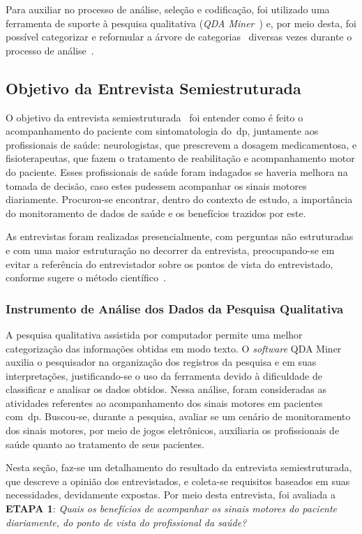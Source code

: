 Para auxiliar no processo de análise, seleção e codificação, foi utilizado uma ferramenta de suporte à pesquisa qualitativa (\textit{QDA Miner}~\cite{qda13}) e, por meio desta, foi possível categorizar e reformular a árvore de categorias~\cite{FLI04} diversas vezes durante o processo de análise~\cite{FLI04}.


\subsection{Objetivo da Entrevista Semiestruturada}
O objetivo da entrevista semiestruturada~\cite{FLI04} foi entender como é feito o acompanhamento do paciente com sintomatologia do~\ac{dp}, juntamente aos profissionais de saúde: neurologistas, que prescrevem a dosagem medicamentosa, e fisioterapeutas, que fazem o tratamento de reabilitação e acompanhamento motor do paciente. Esses profissionais de saúde foram indagados se haveria melhora na tomada de decisão, caso estes pudessem acompanhar os sinais motores diariamente. Procurou-se encontrar, dentro do contexto de estudo, a importância do monitoramento de dados de saúde e os benefícios trazidos por este.

As entrevistas foram realizadas presencialmente, com perguntas não estruturadas e com uma maior estruturação no decorrer da entrevista, preocupando-se em evitar a referência do entrevistador sobre os pontos de vista do entrevistado, conforme sugere o método científico~\cite{FLI04}. 

\subsubsection{Instrumento de Análise dos Dados da Pesquisa Qualitativa} \label{section:analise_dados} 
A pesquisa qualitativa assistida por computador permite uma melhor categorização das informações obtidas em modo texto. O \textit{software} QDA Miner~\cite{qda13} auxilia o pesquisador na organização dos registros da pesquisa e em suas interpretações, justificando-se o uso da ferramenta devido à dificuldade de classificar e analisar os dados obtidos. Nessa análise, foram consideradas as atividades referentes ao acompanhamento dos sinais motores em pacientes com~\ac{dp}. Buscou-se, durante a pesquisa, avaliar se um cenário de monitoramento dos sinais motores, por meio de jogos eletrônicos, auxiliaria os profissionais de saúde quanto ao tratamento de seus pacientes.

Nesta seção, faz-se um detalhamento do resultado da entrevista semiestruturada, que descreve a opinião dos entrevistados, e coleta-se requisitos baseados em suas necessidades, devidamente expostas. Por meio desta entrevista, foi avaliada a \textbf{ETAPA 1}: \textit{Quais os benefícios de acompanhar os sinais motores do paciente diariamente, do ponto de vista do profissional da saúde?}

